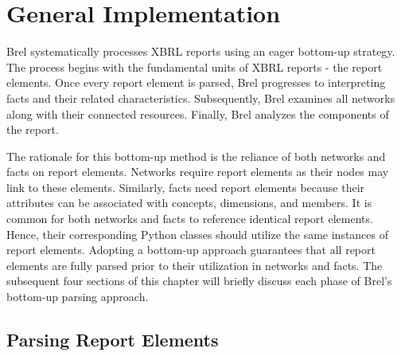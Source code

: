 \section{General Implementation}
\label{sec:implementation_general}


Brel systematically processes XBRL reports using an eager bottom-up strategy.
The process begins with the fundamental units of XBRL reports - the report elements.
Once every report element is parsed, Brel progresses to interpreting facts and their related characteristics.
Subsequently, Brel examines all networks along with their connected resources.
Finally, Brel analyzes the components of the report.

The rationale for this bottom-up method is the reliance of both networks and facts on report elements.
Networks require report elements as their nodes may link to these elements.
Similarly, facts need report elements because their attributes can be associated with concepts, dimensions, and members.
It is common for both networks and facts to reference identical report elements.
Hence, their corresponding Python classes should utilize the same instances of report elements.
Adopting a bottom-up approach guarantees that all report elements are fully parsed prior to their utilization in networks and facts.
The subsequent four sections of this chapter will briefly discuss each phase of Brel's bottom-up parsing approach.

\subsection{Parsing Report Elements}
\label{sec:implementation_report_elements}

